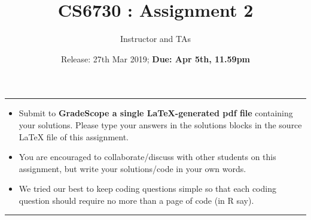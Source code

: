 \documentclass[addpoints,11pt,a4paper]{exam}
\title{CS6730 : Assignment 2}
\author{Instructor and TAs}
\date{Release: 27th Mar 2019; {\bf Due: Apr 5th, 11.59pm}}
\begin{document}
\maketitle
\noindent\rule{\textwidth}{1pt}
\begin{itemize}
    \item Submit to {\bf GradeScope a single LaTeX-generated pdf file} containing your solutions. Please type your answers in the solutions blocks in the source LaTeX file of this assignment. 
    \item You are encouraged to collaborate/discuss with other students on this assignment, but write your solutions/code in your own words.
    \item We tried our best to keep coding questions simple so that each coding question should require no more than a page of code (in R say).  
\end{itemize}
\noindent\rule{\textwidth}{1pt}
\end{document}
